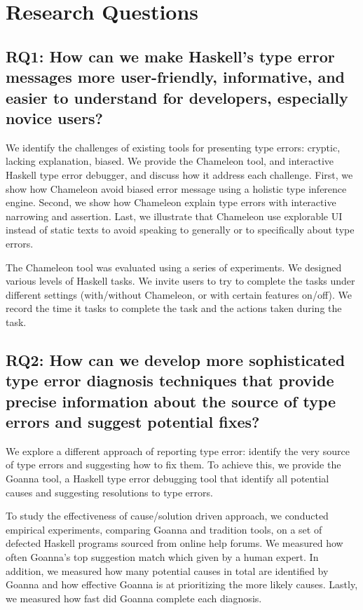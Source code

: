 \section{Research Questions} \label{sec:research-questions}


\subsection{RQ1: How can we make Haskell's type error messages more user-friendly, informative, and easier to understand for developers, especially novice users?}

We identify the challenges of existing tools for presenting type errors: cryptic, lacking explanation, biased. We provide the Chameleon tool, and interactive Haskell type error debugger, and discuss how it address each challenge. First, we show how Chameleon avoid biased error message using a holistic type inference engine. Second, we show how Chameleon explain type errors with interactive narrowing and assertion. Last, we illustrate that Chameleon use explorable UI instead of static texts to avoid speaking to generally or to specifically about type errors.


The Chameleon tool was evaluated using a series of experiments. We designed various levels of Haskell tasks. We invite users to try to complete the tasks under different settings (with/without Chameleon, or with certain features on/off). We record the time it tasks to complete the task and the actions taken during the task.

\subsection{RQ2: How can we develop more sophisticated type error diagnosis techniques that provide precise information about the source of type errors and suggest potential fixes?}

We explore a different approach of reporting type error: identify the very source of type errors and suggesting how to fix them. To achieve this, we provide the Goanna tool, a Haskell type error debugging tool that identify all potential causes and suggesting resolutions to type errors. 

To study the effectiveness of cause/solution driven approach, we conducted empirical experiments, comparing Goanna and tradition tools, on a set of defected Haskell programs sourced from online help forums. We measured how often Goanna's top suggestion match which given by a human expert. In addition, we measured how many potential causes in total are identified by Goanna and how effective Goanna is at prioritizing the more likely causes. Lastly, we measured how fast did Goanna complete each diagnosis. 



